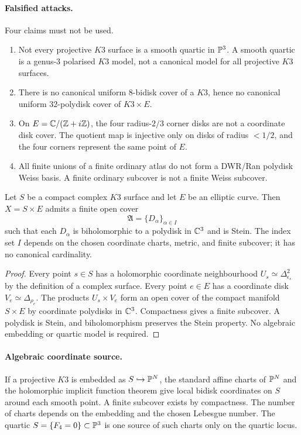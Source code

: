 \paragraph{Falsified attacks.}
\ClaimStatusFalsified{}
Four claims must not be used.
\begin{enumerate}
\item Not every projective $K3$ surface is a smooth quartic in
$\mathbb{P}^3$. A smooth quartic is a genus-$3$ polarised $K3$ model, not a
canonical model for all projective $K3$ surfaces.
\item There is no canonical uniform $8$-bidisk cover of a $K3$, hence
no canonical uniform $32$-polydisk cover of $K3\times E$.
\item On $E=\mathbb{C}/(\mathbb{Z}+i\mathbb{Z})$, the four radius-$2/3$ corner disks are not a
coordinate disk cover. The quotient map is injective only on disks of
radius $<1/2$, and the four corners represent the same point of $E$.
\item All finite unions of a finite ordinary atlas do not form a
DWR/Ran polydisk Weiss basis. A finite ordinary subcover is not a
finite Weiss subcover.
\end{enumerate}

\begin{theorem}
\label{thm:finite-coordinate-polydisk-atlas-k3xe-healed}
\ClaimStatusProvedHere{}
Let $S$ be a compact complex $K3$ surface and let $E$ be an elliptic
curve. Then $X=S\times E$ admits a finite open cover
\[
 \mathfrak A=\{D_\alpha\}_{\alpha\in I}
\]
such that each $D_\alpha$ is biholomorphic to a polydisk in $\mathbb{C}^3$ and
is Stein. The index set $I$ depends on the chosen coordinate charts,
metric, and finite subcover; it has no canonical cardinality.
\end{theorem}

\begin{proof}
Every point $s\in S$ has a holomorphic coordinate neighbourhood
$U_s\simeq \Delta^2_{\epsilon_s}$ by the definition of a complex
surface. Every point $e\in E$ has a coordinate disk
$V_e\simeq \Delta_{\rho_e}$. The products
$U_s\times V_e$ form an open cover of the compact manifold
$S\times E$ by coordinate polydisks in $\mathbb{C}^3$. Compactness gives a
finite subcover. A polydisk is Stein, and biholomorphism preserves the
Stein property. No algebraic embedding or quartic model is required.
\end{proof}

\paragraph{Algebraic coordinate source.}
\ClaimStatusVerified{}
If a projective $K3$ is embedded as $S\hookrightarrow\mathbb{P}^N$, the
standard affine charts of $\mathbb{P}^N$ and the holomorphic implicit function
theorem give local bidisk coordinates on $S$ around each smooth point.
A finite subcover exists by compactness. The number of charts depends
on the embedding and the chosen Lebesgue number. The quartic
$S=\{F_4=0\}\subset\mathbb{P}^3$ is one source of such charts only on the
quartic locus.


